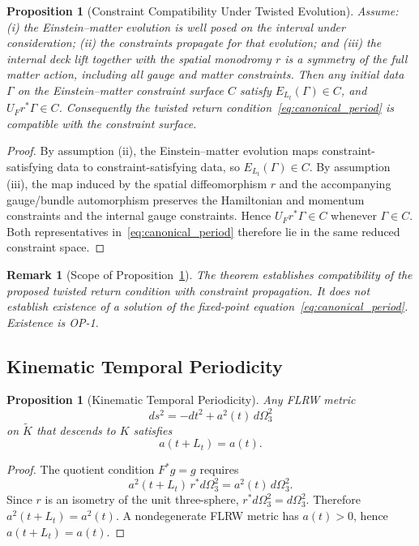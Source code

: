\documentclass[11pt]{article}
\theoremstyle{canonmath}
\newtheorem{proposition}[theorem]{Proposition}
\newtheorem{remark}[theorem]{Remark}
\theoremstyle{canonpostulate}
\theoremstyle{canonclaim}
\providecommand{\Klein}{\mathcal{K}}
\def\mathcal#1{#1}%
\begin{document}
\begin{proposition}[Constraint Compatibility Under Twisted Evolution] \label{thm:constraints}
Assume: (i) the Einstein--matter evolution is well posed on the interval under consideration; (ii) the constraints propagate for that evolution; and (iii) the internal deck lift together with the spatial monodromy $r$ is a symmetry of the full matter action, including all gauge and matter constraints. Then any initial data $\Gamma$ on the Einstein--matter constraint surface $\mathcal C$ satisfy $\mathcal E_{L_t}(\Gamma)\in\mathcal C$, and $U_F r^*\Gamma\in\mathcal C$. Consequently the twisted return condition~\eqref{eq:canonical_period} is compatible with the constraint surface.
\end{proposition}
\begin{proof}
By assumption (ii), the Einstein--matter evolution maps constraint-satisfying data to constraint-satisfying data, so $\mathcal E_{L_t}(\Gamma)\in\mathcal C$. By assumption (iii), the map induced by the spatial diffeomorphism $r$ and the accompanying gauge/bundle automorphism preserves the Hamiltonian and momentum constraints and the internal gauge constraints. Hence $U_F r^*\Gamma\in\mathcal C$ whenever $\Gamma\in\mathcal C$. Both representatives in~\eqref{eq:canonical_period} therefore lie in the same reduced constraint space.
\end{proof}

\begin{remark}[Scope of Proposition~\ref{thm:constraints}]
The theorem establishes compatibility of the proposed twisted return condition with constraint propagation. It does not establish existence of a solution of the fixed-point equation~\eqref{eq:canonical_period}. Existence is OP-1.
\end{remark}

\subsection{Kinematic Temporal Periodicity}

\begin{proposition}[Kinematic Temporal Periodicity] \label{thm:cyclic}
Any FLRW metric
\begin{equation}
ds^2=-dt^2+a^2(t)\,d\Omega_3^2
\end{equation}
on $\widetilde{\Klein}$ that descends to $\Klein$ satisfies
\begin{equation}
a(t+L_t)=a(t).
\end{equation}
\end{proposition}
\begin{proof}
The quotient condition $F^*g=g$ requires
\begin{equation}
a^2(t+L_t)\,r^*d\Omega_3^2=a^2(t)\,d\Omega_3^2.
\end{equation}
Since $r$ is an isometry of the unit three-sphere, $r^*d\Omega_3^2=d\Omega_3^2$. Therefore $a^2(t+L_t)=a^2(t)$. A nondegenerate FLRW metric has $a(t)>0$, hence $a(t+L_t)=a(t)$.
\end{proof}
\end{document}
